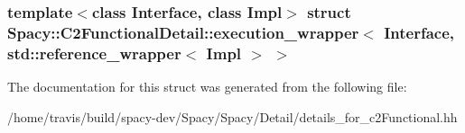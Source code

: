 \subsubsection*{template$<$class Interface, class Impl$>$ struct Spacy\-::\-C2\-Functional\-Detail\-::execution\-\_\-wrapper$<$ Interface, std\-::reference\-\_\-wrapper$<$ Impl $>$ $>$}



\-The documentation for this struct was generated from the following file\-:\begin{DoxyCompactItemize}
\item 
/home/travis/build/spacy-\/dev/\-Spacy/\-Spacy/\-Detail/details\-\_\-for\-\_\-c2\-Functional.\-hh\end{DoxyCompactItemize}
